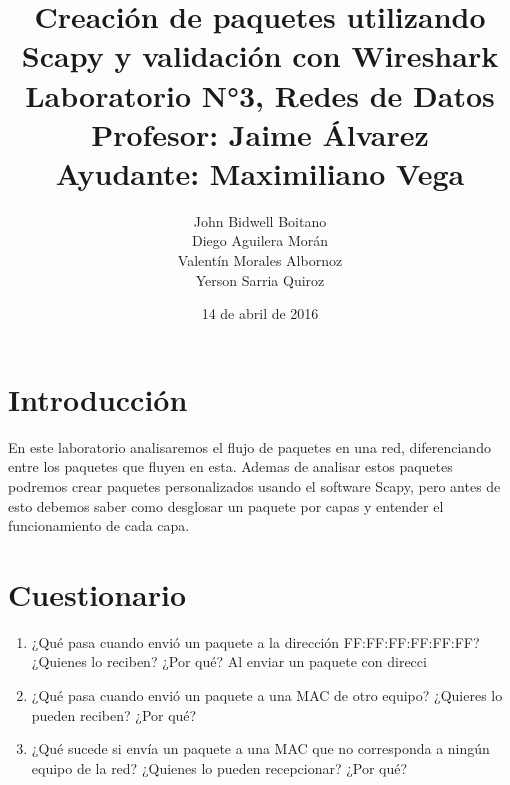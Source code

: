 \documentclass[spanish]{udpreport}
\begin{document}
\title{
	Creación de paquetes utilizando Scapy y validación con Wireshark\\[2ex]
	\normalsize
	Laboratorio N°3, Redes de Datos\\
    Profesor: Jaime Álvarez\\
	Ayudante: Maximiliano Vega
    }
\author{John Bidwell Boitano\\ Diego Aguilera Morán \\ Valentín Morales Albornoz \\ Yerson Sarria Quiroz}
\date{14 de abril de 2016}
\maketitle

\tableofcontents

\chapter{Introducción}
En este laboratorio analisaremos el flujo de paquetes en una red, diferenciando entre los paquetes que fluyen en esta.
Ademas de analisar estos paquetes podremos crear paquetes personalizados usando el software Scapy, pero antes de esto debemos saber como desglosar un paquete por capas y entender el funcionamiento de cada capa.
\chapter{Cuestionario}
\begin{enumerate}

\item¿Qué  pasa  cuando  envió  un  paquete  a  la  dirección  FF:FF:FF:FF:FF:FF?  ¿Quienes 
lo reciben? ¿Por qué?
Al enviar un paquete con direcci

\item¿Qué  pasa  cuando  envió  un  paquete  a  una  MAC  de  otro  equipo?  ¿Quieres  lo pueden reciben? ¿Por qué?

\item¿Qué  sucede  si  envía  un  paquete  a  una  MAC  que  no  corresponda  a  ningún  equipo de la red? ¿Quienes lo pueden recepcionar? ¿Por qué?

\end{enumerate}
\end{document}
